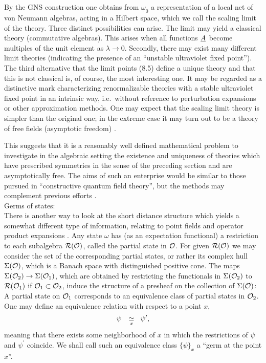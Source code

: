 By the GNS construction one obtains from
$\underline{\omega}_0$ a representation of a local net of von 
Neumann algebras, acting in
a Hilbert space, which we call the scaling limit of the
theory. Three distinct possibilities can arise. The limit may yield a
classical theory (commutative algebras). This arises when all 
functions ${\underline{A}_{}}$ become multiples of the unit element
as $\lambda \to 0$. Secondly, there may exist
many different limit theories (indicating the presence of 
an ``unstable ultraviolet fixed
point''). The third alternative that the limit points (8.5)
define a unique theory and that this is not
classical is, of course, the
most interesting one. It may be regarded as a distinctive mark
characterizing renormalizable theories 
with a stable ultraviolet fixed point in an intrinsic way,
i.e.\ without reference to perturbation expansions or other
approximation methods. 
One may expect that the scaling limit theory is 
simpler than the original one; in the extreme case it may turn out to
be a theory of free fields (asymptotic freedom) \cite{Bu4}. 

This suggests that it is a reasonably well defined mathematical
problem to investigate in the algebraic setting 
the existence and uniqueness of theories which
have prescribed symmetries in the sense of the preceding section and
are asymptotically free. The aims of such an enterprise would 
be similar to those pursued in ``constructive quantum field 
theory'', but the methods may complement  previous efforts 
\cite{GlJa}. \\[2mm] 
{\subsect Germs of states:} \\[2mm]
There is another way to look at the short distance structure
\cite{HaOj} which
yields a somewhat different type of information, relating to point
fields and operator product expansions \cite{WiZi}. Any state $\omega$
has (as an expectation functional) a restriction to each subalgebra ${\cal R}({\cal O})$,
called the partial state in 
${\cal O}$. For given ${\cal R}({\cal O})$ we may consider the set
of the corresponding partial states, or rather its complex hull
${\Sigma}({\cal O})$, which is a Banach space with distinguished positive
cone. The maps ${\Sigma} ({\cal O}_2) \to {\Sigma} ({\cal O}_1)$,  
which are obtained by restricting the functionals in 
${\Sigma} ({\cal O}_2)$ to ${\cal R}({\cal O}_1)$
if ${\cal O}_1 \subset {\cal O}_2$, induce the  
structure of a presheaf on the collection of ${\Sigma}({\cal O})$:
A partial state on ${\cal O}_1$ corresponds to an equivalence
class of partial states in ${\cal O}_2$. One may define
an equivalence relation with respect to a point $x$,
\begin{equation}
\psi \quad
\mbox{$\simeq$ \raisebox{-1.4ex}{\hspace*{-2.9ex} $\scriptstyle x$}}  
\quad \psi^\prime,
\end{equation}
meaning that there exists some neighborhood of $x$ in which
the restrictions of $\psi$ and $\psi^\prime$ coincide.
We shall call such an equivalence class $\{ \psi \}_x$ 
a ``germ at the point $x$''.

